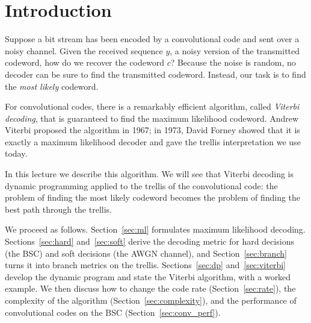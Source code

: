 \Contributor{}

\lstset{style=mystyle}

	\MakeScribeTop


\section{Introduction}
Suppose a bit stream has been encoded by a convolutional code and sent over a noisy channel. Given the received sequence \(y\), a noisy version of the transmitted codeword, how do we recover the codeword \(c\)? Because the noise is random, no decoder can be sure to find the transmitted codeword. Instead, our task is to find the \emph{most likely} codeword.

For convolutional codes, there is a remarkably efficient algorithm, called \emph{Viterbi decoding}, that is guaranteed to find the maximum likelihood codeword. Andrew Viterbi proposed the algorithm in 1967; in 1973, David Forney showed that it is exactly a maximum likelihood decoder and gave the trellis interpretation we use today.

In this lecture we describe this algorithm. We will see that Viterbi decoding is dynamic programming applied to the trellis of the convolutional code: the problem of finding the most likely codeword becomes the problem of finding the best path through the trellis.

We proceed as follows. Section~\ref{sec:ml} formulates maximum likelihood decoding. Sections~\ref{sec:hard} and~\ref{sec:soft} derive the decoding metric for hard decisions (the BSC) and soft decisions (the AWGN channel), and Section~\ref{sec:branch} turns it into branch metrics on the trellis. Sections~\ref{sec:dp} and~\ref{sec:viterbi} develop the dynamic program and state the Viterbi algorithm, with a worked example. We then discuss how to change the code rate (Section~\ref{sec:rate}), the complexity of the algorithm (Section~\ref{sec:complexity}), and the performance of convolutional codes on the BSC (Section~\ref{sec:conv_perf}).

